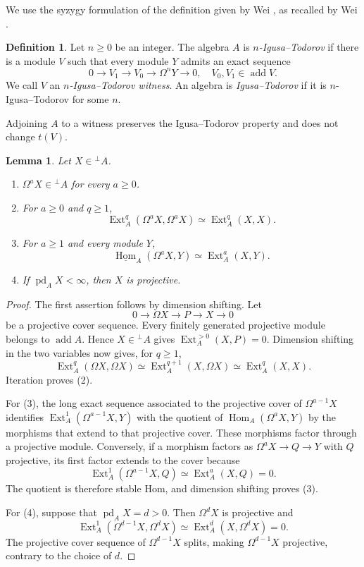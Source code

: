 \documentclass[a4paper,reqno]{amsart}
\numberwithin{equation}{section}
\newtheorem{lem}[thm]{Lemma}
\theoremstyle{definition}
\newtheorem{defn}[thm]{Definition}
\DeclareMathOperator{\Ext}{Ext}
\DeclareMathOperator{\Hom}{Hom}
\DeclareMathOperator{\add}{add}
\DeclareMathOperator{\pd}{pd}
\newcommand{\stHom}{\underline{\Hom}}
\newcommand{\perpA}{{}^{\perp}A}
\begin{document}
We use the syzygy formulation of the definition given by Wei \cite{Wei2009}, as recalled by Wei \cite[Section~5]{Wei2011}.

\begin{defn}\label{def:IT}
Let $n\geq0$ be an integer. The algebra $A$ is \emph{$n$-Igusa--Todorov} if there is a module $V$ such that every module $Y$ admits an exact sequence
\[
0\longrightarrow V_1\longrightarrow V_0\longrightarrow\Omega^nY\longrightarrow0,
\quad V_0,V_1\in\add V.
\]
We call $V$ an \emph{$n$-Igusa--Todorov witness}. An algebra is \emph{Igusa--Todorov} if it is $n$-Igusa--Todorov for some $n$.
\end{defn}

Adjoining $A$ to a witness preserves the Igusa--Todorov property and does not change $t(V)$.

\begin{lem}\label{lem:syzygy}
Let $X\in\perpA$.
\begin{enumerate}
\item $\Omega^aX\in\perpA$ for every $a\geq0$.
\item For $a\geq0$ and $q\geq1$,
\[
\Ext_A^q(\Omega^aX,\Omega^aX)\simeq\Ext_A^q(X,X).
\]
\item For $a\geq1$ and every module $Y$,
\[
\stHom_A(\Omega^aX,Y)\simeq\Ext_A^a(X,Y).
\]
\item If $\pd_A X<\infty$, then $X$ is projective.
\end{enumerate}
\end{lem}

\begin{proof}
The first assertion follows by dimension shifting. Let
\[
0\longrightarrow\Omega X\longrightarrow P\longrightarrow X\longrightarrow0
\]
be a projective cover sequence. Every finitely generated projective module belongs to $\add A$. Hence $X\in\perpA$ gives $\Ext_A^{>0}(X,P)=0$. Dimension shifting in the two variables now gives, for $q\geq1$,
\[
\Ext_A^q(\Omega X,\Omega X)
\simeq\Ext_A^{q+1}(X,\Omega X)
\simeq\Ext_A^q(X,X).
\]
Iteration proves (2).

For (3), the long exact sequence associated to the projective cover of $\Omega^{a-1}X$ identifies $\Ext_A^1(\Omega^{a-1}X,Y)$ with the quotient of $\Hom_A(\Omega^aX,Y)$ by the morphisms that extend to that projective cover. These morphisms factor through a projective module. Conversely, if a morphism factors as $\Omega^aX\to Q\to Y$ with $Q$ projective, its first factor extends to the cover because
\[
\Ext_A^1(\Omega^{a-1}X,Q)\simeq\Ext_A^a(X,Q)=0.
\]
The quotient is therefore stable Hom, and dimension shifting proves (3).

For (4), suppose that $\pd_A X=d>0$. Then $\Omega^dX$ is projective and
\[
\Ext_A^1(\Omega^{d-1}X,\Omega^dX)
\simeq\Ext_A^d(X,\Omega^dX)=0.
\]
The projective cover sequence of $\Omega^{d-1}X$ splits, making $\Omega^{d-1}X$ projective, contrary to the choice of $d$.
\end{proof}
\end{document}
